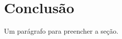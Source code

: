 \section{Conclusão}
\label{sec:conclusao}

Um parágrafo para preencher a seção. {\color{blue}\lipsum[1]}